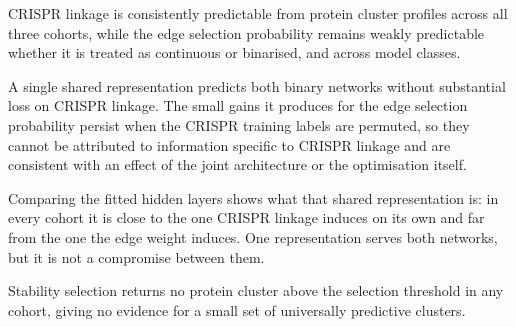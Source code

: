 CRISPR linkage is consistently predictable from protein cluster profiles across all three cohorts, while
the edge selection probability remains weakly predictable whether it is treated as continuous or
binarised, and across model classes.

A single shared representation predicts both binary networks without substantial loss on CRISPR linkage.
The small gains it produces for the edge selection probability persist when the CRISPR training labels are
permuted, so they cannot be attributed to information specific to CRISPR linkage and are consistent with
an effect of the joint architecture or the optimisation itself.

Comparing the fitted hidden layers shows what that shared representation is: in every cohort it is close
to the one CRISPR linkage induces on its own and far from the one the edge weight induces. One
representation serves both networks, but it is not a compromise between them.

Stability selection returns no protein cluster above the selection threshold in any cohort, giving no
evidence for a small set of universally predictive clusters.
